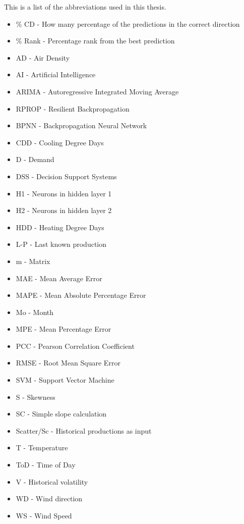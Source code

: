 This is a list of the abbreviations used in this thesis.

\begin{itemize}
	\item \% CD - How many percentage of the predictions in the correct direction  
	\item \% Rank - Percentage rank from the best prediction
	\item AD - Air Density
	\item AI - Artificial Intelligence
	\item ARIMA - Autoregressive Integrated Moving Average
	\item RPROP - Resilient Backpropagation
	\item BPNN - Backpropagation Neural Network
	\item CDD - Cooling Degree Days
	\item D - Demand
	\item DSS - Decision Support Systems
	\item H1 - Neurons in hidden layer 1
	\item H2 - Neurons in hidden layer 2
	\item HDD - Heating Degree Days
	\item L-P - Last known production
	\item m - Matrix
	\item MAE - Mean Average Error
	\item MAPE - Mean Absolute Percentage Error
	\item Mo - Month
	\item MPE - Mean Percentage Error
	\item PCC - Pearson Correlation Coefficient
	\item RMSE - Root Mean Square Error
	\item SVM - Support Vector Machine
	\item S - Skewness
	\item SC - Simple slope calculation
	\item Scatter/Sc - Historical productions as input
	\item T - Temperature
	\item ToD - Time of Day
	\item V - Historical volatility
	\item WD - Wind direction
	\item WS - Wind Speed
\end{itemize}